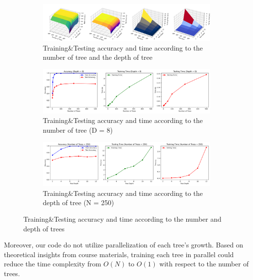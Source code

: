 \begin{figure}
	\centering
	\begin{subfigure}[H]{\linewidth}
		\centering
		\includegraphics[width=\linewidth]{image/q2-fig1-1.png}
		\caption{Training\&Testing accuracy and time according to the number of tree and the depth of tree}
		\label{fig:q2-fig1}
	\end{subfigure}
	\begin{subfigure}[H]{\linewidth}
		\centering
		\includegraphics[width=\linewidth]{image/q2-fig2.png}
		\caption{Training\&Testing accuracy and time according to the number of tree (D = 8)}
		\label{fig:q2-fig2}
	\end{subfigure}
	\begin{subfigure}[H]{\linewidth}
		\centering
		\includegraphics[width=\linewidth]{image/q2-fig3.png}
		\caption{Training\&Testing accuracy and time according to the depth of tree (N = 250)}
		\label{fig:q2-fig3}
	\end{subfigure}
	\caption{Training\&Testing accuracy and time according to the number and depth of trees}
\end{figure}
\noindent
Moreover, our code do not utilize parallelization of each tree's growth. Based on theoretical insights from course materials, training each tree in parallel could reduce the time complexity from $O(N)$ to $O(1)$ with respect to the number of trees.

